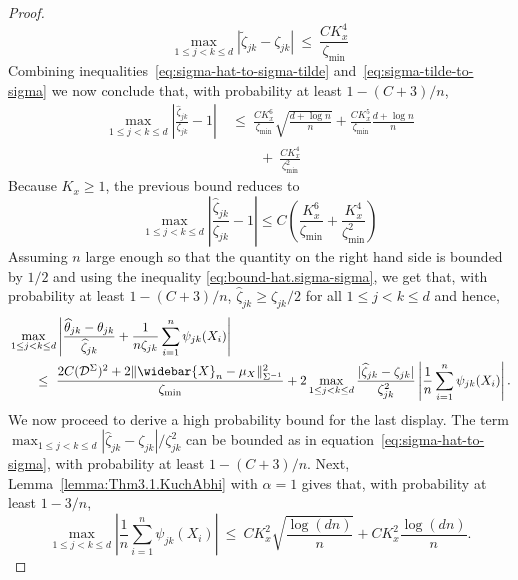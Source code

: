 \documentclass{article}
\begin{document}
\begin{appendices}
\begin{proof}
\begin{equation}\label{eq:sigma-tilde-to-sigma}
\max_{1\le j < k\le d}\left|\widetilde{\zeta}_{jk} - \zeta_{jk}\right| ~\le~ \frac{CK_x^4}{\zeta_{\min}}\left.
\end{equation}
Combining inequalities~\eqref{eq:sigma-hat-to-sigma-tilde} and~\eqref{eq:sigma-tilde-to-sigma} we now conclude that, with probability at least $1 - (C+3)/n$,
\begin{align*}
\max_{1\le j < k\le d}\left|\frac{\widehat{\zeta}_{jk}}{\zeta_{jk}} - 1\right| ~&\le~ \frac{CK_x^6}{\zeta_{\min}}\sqrt{\frac{d + \log n}{n}} + \frac{CK_x^5}{\zeta_{\min}}\frac{d + \log n}{n}\\ ~&\qquad+~ \frac{CK_x^4}{\zeta_{\min}^2}\left.
\end{align*}
Because $K_x \ge 1$, the previous bound reduces to
\begin{equation}\label{eq:sigma-hat-to-sigma}
\max_{1\le j < k\le d}\left|\frac{\widehat{\zeta}_{jk}}{\zeta_{jk}} - 1\right|
\leq C\left(\frac{K_x^6}{\zeta_{\min}} + \frac{K_x^4}{\zeta_{\min}^2}\right)\left.
\end{equation}
Assuming $n$ large enough so that the quantity on the right hand side is bounded by $1/2$ and using the inequality \eqref{eq:bound-hat.sigma-sigma}, we get that, with probability at least $1 - (C + 3)/n$, $\widehat{\zeta}_{jk} \ge \zeta_{jk}/2$ for all $1\le j < k\le d$ and hence,
\begin{align*}
&\max_{1\le j < k\le d}\left|\frac{\widehat{\theta}_{jk} - \theta_{jk}}{\widehat{\zeta}_{jk}} + \frac{1}{n\zeta_{jk}}\sum_{i=1}^n \psi_{jk}(X_i)\right|\\ &\qquad\le~ \frac{2C(\mathcal{D}^{\Sigma})^2 + 2\|\widebar{X}_n - \mu_X\|_{\Sigma^{-1}}^2}{\zeta_{\min}}
+ 2\max_{1\le j < k\le d}\frac{|\widehat{\zeta}_{jk} - \zeta_{jk}|}{\zeta_{jk}^2}\left|\frac{1}{n}\sum_{i=1}^n \psi_{jk}(X_i)\right|.
\end{align*}
We now proceed to derive a high probability bound for the last display. The term $\max_{1\le j < k\le d}{|\widehat{\zeta}_{jk} - \zeta_{jk}|}/{\zeta_{jk}^2}$ can be bounded as in equation~\eqref{eq:sigma-hat-to-sigma}, with probability at least
$1 - (C+3)/n$. Next, Lemma~\ref{lemma:Thm3.1.KuchAbhi} with $\alpha=1$ gives that, with probability at least $1 - 3/n$,
\begin{equation}\label{eq:bound-on-sum-psi}
\max_{1\le j < k\le d}\left|\frac{1}{n}\sum_{i=1}^n \psi_{jk}(X_i)\right| ~\le~ CK_x^2\sqrt{\frac{\log(dn)}{n}} + CK_x^2\frac{\log(dn)}{n}.
\end{equation}

\end{proof}
\end{appendices}
\end{document}
